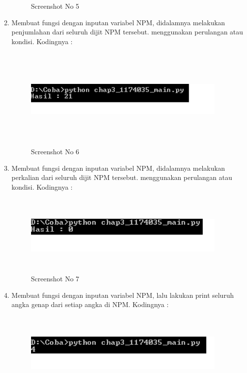 \begin{enumerate}
\begin{figure}[!htbp]
        \caption{Screenshot No 5}
        \label{1174035_5}
	\end{figure}
	\item Membuat fungsi dengan inputan variabel NPM, didalamnya melakukan penjumlahan dari seluruh dijit NPM tersebut. menggunakan perulangan atau kondisi. Kodingnya : 
	
	\begin{figure}[!htbp]
        \centering
        \includegraphics[height=5cm, width=10cm]{figures/chapter3/1174035_6.png}
        \caption{Screenshot No 6}
        \label{1174035_6}
	\end{figure}
	\item Membuat fungsi dengan inputan variabel NPM, didalamnya melakukan perkalian dari seluruh dijit NPM tersebut. menggunakan perulangan atau kondisi. Kodingnya : 
	
	\begin{figure}[!htbp]
        \centering
        \includegraphics[height=4cm, width=10cm]{figures/chapter3/1174035_7.png}
        \caption{Screenshot No 7}
        \label{1174035_7}
	\end{figure}
	\item Membuat fungsi dengan inputan variabel NPM, lalu lakukan print seluruh angka genap dari setiap angka di NPM. Kodingnya : 
	
	\begin{figure}[!htbp]
        \centering
        \includegraphics[height=4cm, width=10cm]{figures/chapter3/1174035_8.png}

\end{figure}
\end{enumerate}
